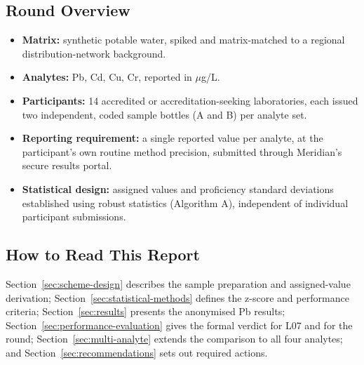 \subsection{Round Overview}
\begin{itemize}
  \item \textbf{Matrix:} synthetic potable water, spiked and matrix-matched to a regional
        distribution-network background.
  \item \textbf{Analytes:} Pb, Cd, Cu, Cr, reported in \(\mu\)g/L.
  \item \textbf{Participants:} 14 accredited or accreditation-seeking laboratories, each issued
        two independent, coded sample bottles (A and B) per analyte set.
  \item \textbf{Reporting requirement:} a single reported value per analyte, at the participant's
        own routine method precision, submitted through Meridian's secure results portal.
  \item \textbf{Statistical design:} assigned values and proficiency standard deviations
        established using robust statistics (Algorithm A), independent of individual participant
        submissions.
\end{itemize}

\subsection{How to Read This Report}
Section~\ref{sec:scheme-design} describes the sample preparation and assigned-value derivation;
Section~\ref{sec:statistical-methods} defines the z-score and performance criteria;
Section~\ref{sec:results} presents the anonymised Pb results; Section~\ref{sec:performance-evaluation}
gives the formal verdict for L07 and for the round; Section~\ref{sec:multi-analyte} extends the
comparison to all four analytes; and Section~\ref{sec:recommendations} sets out required actions.

